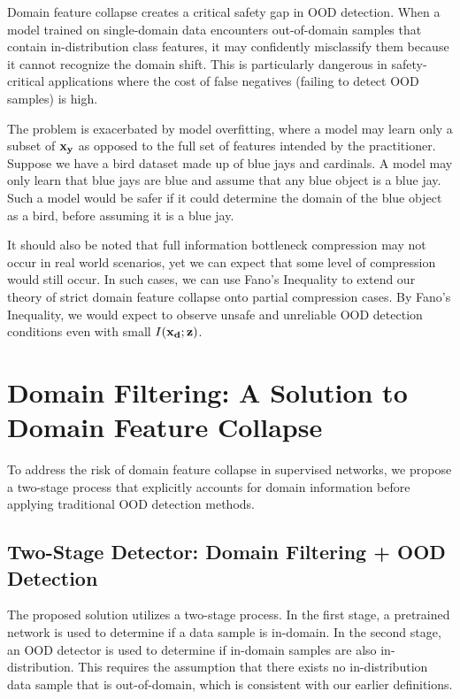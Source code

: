 \documentclass[11pt, oneside]{book}
\theoremstyle{plain}
\theoremstyle{definition}
\theoremstyle{remark}
\begin{document}
Domain feature collapse creates a critical safety gap in OOD detection. When a model trained on single-domain data encounters out-of-domain samples that contain in-distribution class features, it may confidently misclassify them because it cannot recognize the domain shift. This is particularly dangerous in safety-critical applications where the cost of false negatives (failing to detect OOD samples) is high.

The problem is exacerbated by model overfitting, where a model may learn only a subset of ${\mathbf{x}}_{\mathbf{y}}$ as opposed to the full set of features intended by the practitioner. Suppose we have a bird dataset made up of blue jays and cardinals. A model may only learn that blue jays are blue and assume that any blue object is a blue jay. Such a model would be safer if it could determine the domain of the blue object as a bird, before assuming it is a blue jay.

It should also be noted that full information bottleneck compression may not occur in real world scenarios, yet we can expect that some level of compression would still occur. In such cases, we can use Fano's Inequality to extend our theory of strict domain feature collapse onto partial compression cases. By Fano's Inequality, we would expect to observe unsafe and unreliable OOD detection conditions even with small $I({\mathbf{x}}_{\mathbf{d}}; {\mathbf{z}})$.

\section{Domain Filtering: A Solution to Domain Feature Collapse}

To address the risk of domain feature collapse in supervised networks, we propose a two-stage process that explicitly accounts for domain information before applying traditional OOD detection methods.

\subsection{Two-Stage Detector: Domain Filtering + OOD Detection}

The proposed solution utilizes a two-stage process. In the first stage, a pretrained network is used to determine if a data sample is in-domain. In the second stage, an OOD detector is used to determine if in-domain samples are also in-distribution. This requires the assumption that there exists no in-distribution data sample that is out-of-domain, which is consistent with our earlier definitions.
\end{document}

